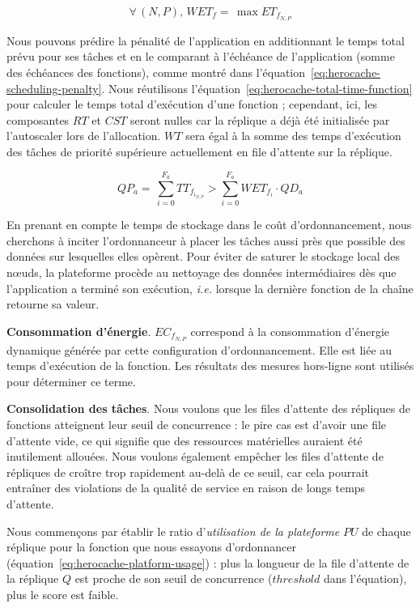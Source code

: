 \begin{equation}
    \forall \, (N, P), \, WET_{f} = \, \max ET_{f_{N, P}}
\label{eq:herocache-task-wet}
\end{equation}

Nous pouvons prédire la pénalité de l'application en additionnant le temps total prévu pour ses tâches et en le comparant à l'échéance de l'application (somme des échéances des fonctions), comme montré dans l'équation~\ref{eq:herocache-scheduling-penalty}. Nous réutilisons l'équation~\ref{eq:herocache-total-time-function} pour calculer le temps total d'exécution d'une fonction ; cependant, ici, les composantes $RT$ et $CST$ seront nulles car la réplique a déjà été initialisée par l'autoscaler lors de l'allocation. $WT$ sera égal à la somme des temps d'exécution des tâches de priorité supérieure actuellement en file d'attente sur la réplique.

\begin{equation}
   QP_{a} = \, \sum_{i = 0}^{F_a} TT_{{f}_{{i}_{N, P}}} > \sum_{i = 0}^{F_a} WET_{f_{i}} \cdot QD_{a}
\label{eq:herocache-scheduling-penalty}
\end{equation}

En prenant en compte le temps de stockage dans le coût d'ordonnancement, nous cherchons à inciter l'ordonnanceur à placer les tâches aussi près que possible des données sur lesquelles elles opèrent. Pour éviter de saturer le stockage local des nœuds, la plateforme procède au nettoyage des données intermédiaires dès que l'application a terminé son exécution, \textit{i.e.} lorsque la dernière fonction de la chaîne retourne sa valeur.

\textbf{Consommation d'énergie}. ${EC}_{{f}_{N, P}}$ correspond à la consommation d'énergie dynamique générée par cette configuration d'ordonnancement. Elle est liée au temps d'exécution de la fonction. Les résultats des mesures hors-ligne sont utilisés pour déterminer ce terme.

\textbf{Consolidation des tâches}. Nous voulons que les files d'attente des répliques de fonctions atteignent leur seuil de concurrence : le pire cas est d'avoir une file d'attente vide, ce qui signifie que des ressources matérielles auraient été inutilement allouées. Nous voulons également empêcher les files d'attente de répliques de croître trop rapidement au-delà de ce seuil, car cela pourrait entraîner des violations de la qualité de service en raison de longs temps d'attente.

Nous commençons par établir le ratio d'\textit{utilisation de la plateforme} $PU$ de chaque réplique pour la fonction que nous essayons d'ordonnancer (équation~\ref{eq:herocache-platform-usage}) : plus la longueur de la file d'attente de la réplique $Q$ est proche de son seuil de concurrence ($threshold$ dans l'équation), plus le score est faible.

